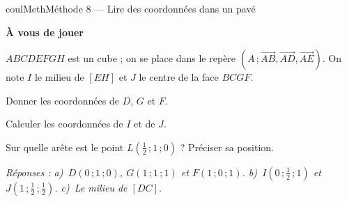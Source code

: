 \documentclass[11pt,a4paper]{article}
\makeatletter
\newcommand{\vect}[1]{\overrightarrow{#1}}
\newcounter{lycee@signet}
\newcommand{\signet}[3][]{\stepcounter{lycee@signet}%
  \edef\lycee@dest{\if\relax\detokenize{#1}\relax
    signet.\arabic{lycee@signet}\else#1\fi}%
  \hypertarget{\lycee@dest}{}\bookmark[level=#2,dest=\lycee@dest]{#3}}
\newcounter{methode}
\newenvironment{methodebox}[1][Méthode]{\stepcounter{methode}%
  \begin{boitecours}[phantom={\signet[methode-\arabic{methode}]{2}{#1}}]{coulMeth}{#1}}%
  {\end{boitecours}}
\newcommand{\etape}[1]{\par\smallskip\textbf{\color{coulMeth}#1}\par\nobreak\smallskip}
\newcommand{\reponse}[1]{\par\smallskip
  {\footnotesize\itshape\color{black!55}Réponses : #1}}
\makeatother
\begin{document}
\begin{methodebox}[Méthode 8 --- Lire des coordonnées dans un pavé]
\etape{À vous de jouer}
$ABCDEFGH$ est un cube ; on se place dans le repère $(A\,;\vect{AB},\vect{AD},\vect{AE})$. On note $I$ le milieu de $[EH]$ et $J$ le centre de la face $BCGF$.
\begin{questions}[label=\alph*)]
  \item Donner les coordonnées de $D$, $G$ et $F$.
  \item Calculer les coordonnées de $I$ et de $J$.
  \item Sur quelle arête est le point $L(\frac{1}{2}\,;1\,;0)$ ? Préciser sa position.
\end{questions}
\reponse{a)~$D(0\,;1\,;0)$, $G(1\,;1\,;1)$ et $F(1\,;0\,;1)$.\; b)~$I(0\,;\frac{1}{2}\,;1)$
et $J(1\,;\frac{1}{2}\,;\frac{1}{2})$.\; c)~Le milieu de $[DC]$.}
\end{methodebox}
\end{document}
